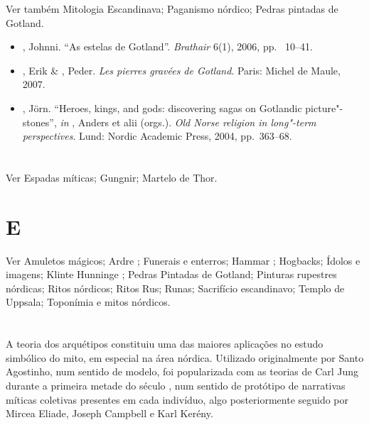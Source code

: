 Ver também Mitologia Escandinava; Paganismo nórdico; Pedras pintadas de
Gotland.



\begin{itemize}\footnotesize
\item
  , Johnni. ``As estelas de Gotland''. \emph{Brathair} 6(1), 2006, pp.~ 10--41.
\item
  , Erik \& , Peder. \emph{Les pierres gravées de Gotland}.
  Paris: Michel de Maule, 2007.
\item
  , Jörn. ``Heroes, kings, and gods: discovering sagas on
  Gotlandic picture"-stones'', \emph{in}  , Anders et alii (orgs.). \emph{Old
  Norse religion in long"-term perspectives}. Lund: Nordic Academic
  Press, 2004, pp.~363--68.
\end{itemize}

\section{ }

Ver Espadas míticas; Gungnir; Martelo de Thor.

\section{ E  }

Ver Amuletos mágicos; Ardre ; Funerais e enterros; Hammar ;
Hogbacks; Ídolos e imagens; Klinte Hunninge ; Pedras Pintadas de
Gotland; Pinturas rupestres nórdicas; Ritos nórdicos; Ritos Rus; Runas;
Sacrifício escandinavo; Templo de Uppsala; Toponímia e mitos nórdicos.

\section{ }

A teoria dos arquétipos constituiu uma das maiores aplicações no estudo
simbólico do mito, em especial na área nórdica. Utilizado originalmente
por Santo Agostinho, num sentido de modelo, foi popularizada com as
teorias de Carl Jung durante a primeira metade do século , num sentido
de protótipo de narrativas míticas coletivas presentes em cada
indivíduo, algo posteriormente seguido por Mircea Eliade, Joseph
Campbell e Karl Kerény.

